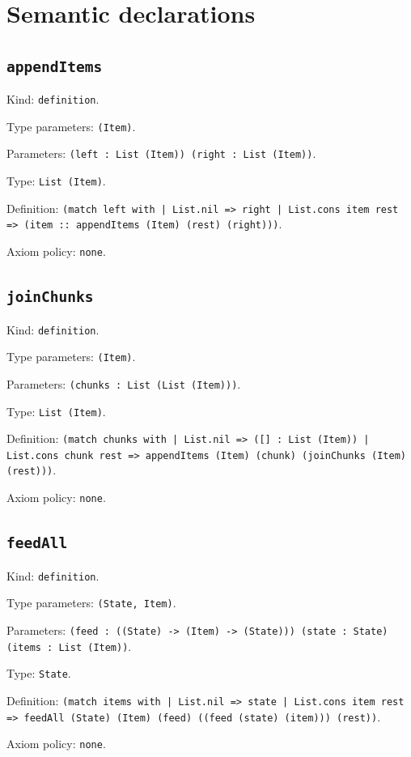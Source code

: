 \documentclass[11pt]{article}
\begin{document}
\section*{Semantic declarations}
\subsection*{\texttt{appendItems}}
\noindent Kind: \texttt{definition}.\par
\noindent Type parameters: \texttt{(Item)}.\par
\noindent Parameters: \texttt{(left : List (Item)) (right : List (Item))}.\par
\noindent Type: \texttt{List (Item)}.\par
\noindent Definition: \texttt{(match left with | List.nil => right | List.cons item rest => (item :: appendItems (Item) (rest) (right)))}.\par
\noindent Axiom policy: \texttt{none}.\par
\subsection*{\texttt{joinChunks}}
\noindent Kind: \texttt{definition}.\par
\noindent Type parameters: \texttt{(Item)}.\par
\noindent Parameters: \texttt{(chunks : List (List (Item)))}.\par
\noindent Type: \texttt{List (Item)}.\par
\noindent Definition: \texttt{(match chunks with | List.nil => ([] : List (Item)) | List.cons chunk rest => appendItems (Item) (chunk) (joinChunks (Item) (rest)))}.\par
\noindent Axiom policy: \texttt{none}.\par
\subsection*{\texttt{feedAll}}
\noindent Kind: \texttt{definition}.\par
\noindent Type parameters: \texttt{(State, Item)}.\par
\noindent Parameters: \texttt{(feed : ((State) -> (Item) -> (State))) (state : State) (items : List (Item))}.\par
\noindent Type: \texttt{State}.\par
\noindent Definition: \texttt{(match items with | List.nil => state | List.cons item rest => feedAll (State) (Item) (feed) ((feed (state) (item))) (rest))}.\par
\noindent Axiom policy: \texttt{none}.\par
\end{document}
